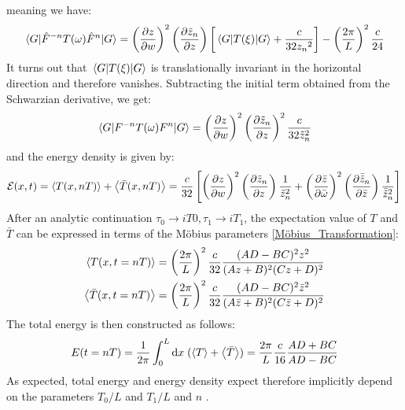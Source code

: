 \documentclass[11pt, a4paper, oneside]{book}
\theoremstyle{definition} %
\begin{document}
meaning we have:
\begin{equation}
	\mel{G}{\hat{F}^{-n} T(\omega) \hat{F}^n}{G} = \left(\pdv{z}{w}\right)^2 \left(\pdv{\tilde{z}_n}{z}\right) \left[ \mel{G}{T(\xi)}{G} + \frac{c}{32{z_n}^2}\right]- \left(\frac{2\pi}{L}\right)^2 \frac{c}{24}
\end{equation}
It turns out that $\mel{G}{T(\xi)}{G}$ is translationally invariant in the horizontal direction and therefore vanishes. Subtracting the initial term obtained from the Schwarzian derivative, we get:
\begin{equation}
	\mel{G}{F^{-n} T(\omega) F^{n}}{G} = \left( \pdv{z}{w} \right)^2 \left(\pdv{\tilde{z}_n}{z}\right)^2 \frac{c}{32\tilde{z}_n^2}
\end{equation}
and the energy density is given by:
\begin{equation}
	\mathcal{E}(x,t) =  \expval{T(x,nT)} + \expval{\bar{T}(x, nT)} = \frac{c}{32}\left[\left( \pdv{z}{w} \right)^2 \left(\pdv{\tilde{z}_n}{z}\right)\frac{1}{\tilde{z}_n^2} + \left(\pdv{\bar{z}}{\bar{\omega}}\right)^2 \left(\pdv{\bar{\tilde{z}}_n}{\bar{z}}\right) \frac{1}{\bar{\tilde{z}}_n^2}  \right]
\end{equation}
After an analytic continuation $\tau_0 \rightarrow iT0, \tau_1 \rightarrow i T_1$, the expectation value of $T$ and $\bar{T}$ can be expressed in terms of the Möbius parameters \ref{Möbius_Transformation}:
\begin{equation}
\begin{split}
	\expval{T(x,t = nT)} = \left( \frac{2\pi}{L}\right)^2 \frac{c}{32}\frac{(AD - BC)^2 z^2}{(Az + B)^2(Cz + D)^2} \\
	\expval{\bar{T}(x, t = nT)} = \left(\frac{2\pi}{L}\right)^2 \frac{c}{32} \frac{(AD - BC)^2 \bar{z}^2}{(A\bar{z} + B)^2 (C\bar{z} + D)^2}
\end{split}
\end{equation}
The total energy is then constructed as follows:
\begin{equation}
	E(t = nT) = \frac{1}{2\pi}\int_{0}^L \dd x \; (\expval{T} + \expval{\bar{T}}) = \frac{2\pi}{L} \frac{c}{16} \frac{AD + BC}{AD - BC}
\end{equation}
As expected, total energy and energy density expect therefore implicitly depend on the parameters $T_0/L$ and $T_1/L$ and $n$ \cite{Lapierre}.
\end{document}
